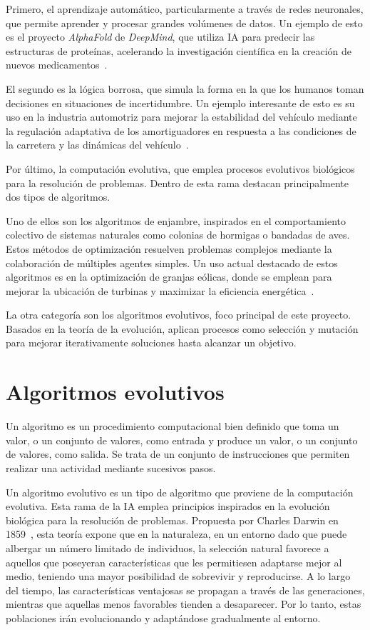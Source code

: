Primero, el aprendizaje automático, particularmente a través de redes neuronales, que permite aprender y procesar grandes volúmenes de datos. Un ejemplo de esto es el proyecto \textit{AlphaFold} de \textit{DeepMind}, que utiliza IA para predecir las estructuras de proteínas, acelerando la investigación científica en la creación de nuevos medicamentos~\cite{alphafold2024}.

El segundo es la lógica borrosa, que simula la forma en la que los humanos toman decisiones en situaciones de incertidumbre. Un ejemplo interesante de esto es su uso en la industria automotriz para mejorar la estabilidad del vehículo mediante la regulación adaptativa de los amortiguadores en respuesta a las condiciones de la carretera y las dinámicas del vehículo~\cite{ivanov2015}.

Por último, la computación evolutiva, que emplea procesos evolutivos biológicos para la resolución de problemas. Dentro de esta rama destacan principalmente dos tipos de algoritmos.

Uno de ellos son los algoritmos de enjambre, inspirados en el comportamiento colectivo de sistemas naturales como colonias de hormigas o bandadas de aves. Estos métodos de optimización resuelven problemas complejos mediante la colaboración de múltiples agentes simples. Un uso actual destacado de estos algoritmos es en la optimización de granjas eólicas, donde se emplean para mejorar la ubicación de turbinas y maximizar la eficiencia energética~\cite{dong2023}.

La otra categoría son los algoritmos evolutivos, foco principal de este proyecto. Basados en la teoría de la evolución, aplican procesos como selección y mutación para mejorar iterativamente soluciones hasta alcanzar un objetivo.

\section{Algoritmos evolutivos}

Un algoritmo es un procedimiento computacional bien definido que toma un valor, o un conjunto de valores, como entrada y produce un valor, o un conjunto de valores, como salida. Se trata de un conjunto de instrucciones que permiten realizar una actividad mediante sucesivos pasos.

Un algoritmo evolutivo es un tipo de algoritmo que proviene de la computación evolutiva. Esta rama de la IA emplea principios inspirados en la evolución biológica para la resolución de problemas. Propuesta por Charles Darwin en 1859~\cite{darwin1859}, esta teoría expone que en la naturaleza, en un entorno dado que puede albergar un número limitado de individuos, la selección natural favorece a aquellos que poseyeran características que les permitiesen adaptarse mejor al medio, teniendo una mayor posibilidad de sobrevivir y reproducirse. A lo largo del tiempo, las características ventajosas se propagan a través de las generaciones, mientras que aquellas menos favorables tienden a desaparecer. Por lo tanto, estas poblaciones irán evolucionando y adaptándose gradualmente al entorno.

